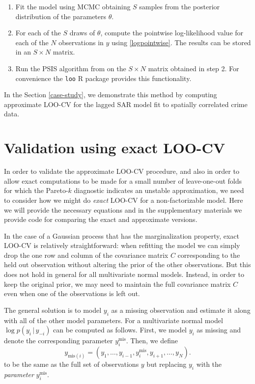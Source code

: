 \documentclass[11pt]{article}
\begin{document}
\begin{enumerate}
\item Fit the model using MCMC obtaining $S$ samples from the posterior
distribution of the parameters $\theta$.
\item For each of the $S$ draws of $\theta$, compute the pointwise
log-likelihood value for each of the $N$ observations in $y$ using
\eqref{logpointwise}. The results can be stored in an $S \times N$ matrix.
\item Run the PSIS algorithm from \cite{vehtari2017loo} on the $S \times N$
matrix obtained in step 2. For convenience the \texttt{loo} R package
\citep{loo2018} provides this functionality.
\end{enumerate}

In the Section \ref{case-study}, we demonstrate this method by computing
approximate LOO-CV for the lagged SAR model fit to spatially correlated 
crime data.

\section{Validation using exact LOO-CV}
\label{exact-loo}

In order to validate the approximate LOO-CV procedure, and also in order to
allow exact computations to be made for a small number of leave-one-out folds
for which the Pareto-$k$ diagnostic \citep{vehtari2017psis} indicates an
unstable approximation, we need to consider how we might do \emph{exact}
LOO-CV for a non-factorizable model. Here we will provide the necessary
equations and in the supplementary materials we provide code for comparing the
exact and approximate versions.

In the case of a Gaussian process that has the marginalization property, exact
LOO-CV is relatively straightforward: when refitting the model we can simply 
drop the one row and column of the covariance matrix $C$ corresponding to the 
held out observation without altering the prior of the other observations. 
But this does not hold in general for all multivariate normal models. 
Instead, in order to keep the original prior, we may need to maintain the full
covariance matrix $C$ even when one of the observations is left out.

The general solution is to model $y_i$ as a missing observation and estimate it
along with all of the other model parameters. For a multivariate normal model
$\log p(y_i\,|\,y_{-i})$ can be computed as follows. First, we model $y_i$ as
missing and denote the corresponding parameter $y_i^{\mathrm{mis}}$. Then, we
define
%
\begin{equation}
y_{\mathrm{mis}(i)} = (y_1, \ldots, y_{i-1}, y_i^{\mathrm{mis}}, y_{i+1}, \ldots, y_N).
\end{equation}
%
to be the same as the full set of observations $y$ but replacing $y_i$ with
the \emph{parameter} $y_i^{\mathrm{mis}}$.
\end{document}
